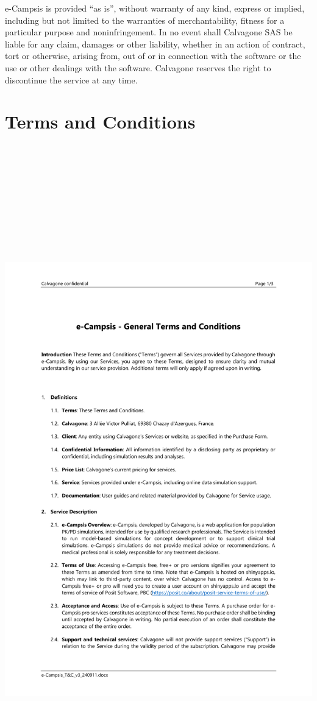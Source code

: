 \documentclass[
]{book}
\begin{document}
e-Campsis is provided ``as is'', without warranty of any kind, express or implied, including but not limited to the warranties of merchantability, fitness for a particular purpose and noninfringement. In no event shall Calvagone SAS be liable for any claim, damages or other liability, whether in an action of contract, tort or otherwise, arising from, out of or in connection with the software or the use or other dealings with the software. Calvagone reserves the right to discontinue the service at any time.

\chapter{Terms and Conditions}\label{terms-and-conditions}

\includegraphics[width=21cm,height=29cm]{pictures/e-Campsis_T&C_v3_240911.pdf}
\end{document}
